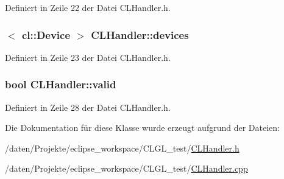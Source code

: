Definiert in Zeile 22 der Datei C\-L\-Handler.\-h.

\hypertarget{classCLHandler_ac09363db47da2dc8bce9c5f6352e02c1}{
\subsubsection[{devices}]{$<$ cl\-::\-Device $>$ C\-L\-Handler\-::devices}}\label{classCLHandler_ac09363db47da2dc8bce9c5f6352e02c1}


Definiert in Zeile 23 der Datei C\-L\-Handler.\-h.

\hypertarget{classCLHandler_ab29da707e0d32b07b733c55551be12af}{
\subsubsection[{valid}]{\setlength{\rightskip}{0pt plus 5cm}bool C\-L\-Handler\-::valid\hspace{0.3cm}{\ttfamily [private]}}}\label{classCLHandler_ab29da707e0d32b07b733c55551be12af}


Definiert in Zeile 28 der Datei C\-L\-Handler.\-h.



Die Dokumentation für diese Klasse wurde erzeugt aufgrund der Dateien\-:\begin{DoxyCompactItemize}
\item 
/daten/\-Projekte/eclipse\-\_\-workspace/\-C\-L\-G\-L\-\_\-test/\hyperlink{CLGL__test_2CLHandler_8h}{C\-L\-Handler.\-h}\item 
/daten/\-Projekte/eclipse\-\_\-workspace/\-C\-L\-G\-L\-\_\-test/\hyperlink{CLGL__test_2CLHandler_8cpp}{C\-L\-Handler.\-cpp}\end{DoxyCompactItemize}
